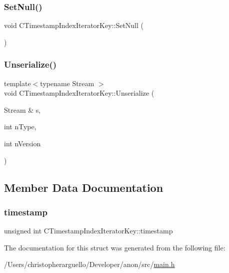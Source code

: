 \subsubsection{\texorpdfstring{Set\+Null()}{SetNull()}}
{\footnotesize\ttfamily void C\+Timestamp\+Index\+Iterator\+Key\+::\+Set\+Null (\begin{DoxyParamCaption}{ }\end{DoxyParamCaption})\hspace{0.3cm}{\ttfamily [inline]}}

\mbox{\label{struct_c_timestamp_index_iterator_key_a3f47d6a35bfe323058960efdb0bf4f26}} 
\subsubsection{\texorpdfstring{Unserialize()}{Unserialize()}}
{\footnotesize\ttfamily template$<$typename Stream $>$ \\
void C\+Timestamp\+Index\+Iterator\+Key\+::\+Unserialize (\begin{DoxyParamCaption}\item[{Stream \&}]{s,  }\item[{int}]{n\+Type,  }\item[{int}]{n\+Version }\end{DoxyParamCaption})\hspace{0.3cm}{\ttfamily [inline]}}



\subsection{Member Data Documentation}
\mbox{\label{struct_c_timestamp_index_iterator_key_a9459c6d565851430bb2edcf6fc601292}} 
\subsubsection{\texorpdfstring{timestamp}{timestamp}}
{\footnotesize\ttfamily unsigned int C\+Timestamp\+Index\+Iterator\+Key\+::timestamp}



The documentation for this struct was generated from the following file\+:\begin{DoxyCompactItemize}
\item 
/\+Users/christopherarguello/\+Developer/anon/src/\mbox{\hyperlink{main_8h}{main.\+h}}\end{DoxyCompactItemize}
